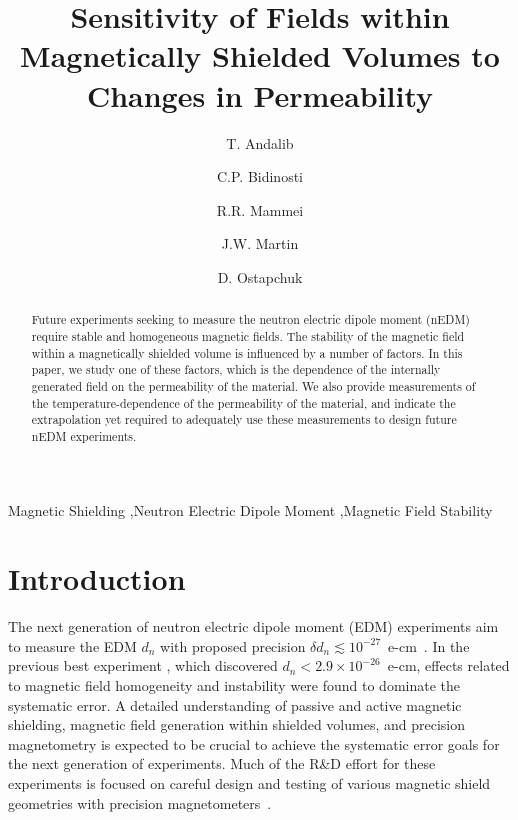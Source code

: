 \documentclass[review]{elsarticle}
\begin{document}
\begin{frontmatter}

\title{Sensitivity of Fields within Magnetically Shielded Volumes to
  Changes in Permeability}

\author[manitoba]{T. Andalib}
\author[winnipeg,manitoba]{C.P. Bidinosti}
\author[winnipeg,manitoba]{R.R. Mammei}
\author[winnipeg,manitoba]{J.W. Martin}
\author[winnipeg]{D. Ostapchuk}

\address[winnipeg]{Physics Department, The University of Winnipeg, 515 Portage Avenue, Winnipeg, MB, R3B 2E9, Canada}
\address[manitoba]{Department of Physics and Astronomy, University of Manitoba, Winnipeg, MB R3T 2N2, Canada}


\begin{abstract}
Future experiments seeking to measure the neutron electric dipole
moment (nEDM) require stable and homogeneous magnetic fields.  The
stability of the magnetic field within a magnetically shielded volume
is influenced by a number of factors.  In this paper, we study one of
these factors, which is the dependence of the internally generated
field on the permeability of the material.  We also provide
measurements of the temperature-dependence of the permeability of the
material, and indicate the extrapolation yet required to adequately
use these measurements to design future nEDM experiments.
\end{abstract}

\begin{keyword}
Magnetic Shielding \sep Neutron Electric Dipole Moment \sep Magnetic Field Stability
\end{keyword}

\end{frontmatter}

\linenumbers

\section{Introduction}

The next generation of neutron electric dipole moment (EDM)
experiments aim to measure the EDM $d_n$ with proposed precision
$\delta d_n\lesssim
10^{-27}$~e-cm~\cite{bib:nedm1,bib:nedm2,bib:nedm2.5,bib:nedm3,bib:nedm3.5,bib:nedm4,bib:nedm5,bib:nedm6,bib:nedm6.5}.
In the previous best experiment \cite{bib:baker}, which discovered
$d_n<2.9\times 10^{-26}$~e-cm, effects related to magnetic field
homogeneity and instability were found to dominate the systematic
error.  A detailed understanding of passive and active magnetic
shielding, magnetic field generation within shielded volumes, and
precision magnetometry is expected to be crucial to achieve the
systematic error goals for the next generation of experiments.  Much
of the R\&D effort for these experiments is focused on careful design
and testing of various magnetic shield geometries with precision
magnetometers~\cite{bib:brys,bib:afach,bib:fierlingerroom,bib:sturmthesis,bib:patton}.
\end{document}
